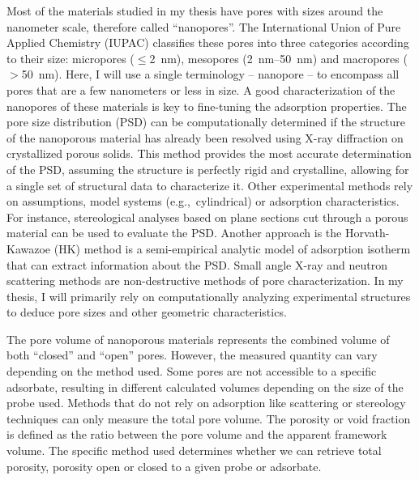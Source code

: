 \documentclass[main.tex]{subfiles}
\begin{document}

Most of the materials studied in my thesis have pores with sizes around the nanometer scale, therefore called ``nanopores''. The International Union of Pure Applied Chemistry (IUPAC) classifies these pores into three categories according to their size: micropores ($\leq$\SI{2}{\nano\meter}), mesopores (\SI{2}{\nano\meter}--\SI{50}{\nano\meter}) and macropores ($>$\SI{50}{\nano\meter}).\autocite{Sing_1985} Here, I will use a single terminology -- nanopore -- to encompass all pores that are a few nanometers or less in size. A good characterization of the nanopores of these materials is key to fine-tuning the adsorption properties.\autocite{Yan_2020} The pore size distribution (PSD) can be computationally determined if the structure of the nanoporous material has already been resolved using X-ray diffraction on crystallized porous solids. This method provides the most accurate determination of the PSD, assuming the structure is perfectly rigid and crystalline, allowing for a single set of structural data to characterize it. Other experimental methods rely on assumptions, model systems (e.g.,\ cylindrical) or adsorption characteristics. For instance, stereological analyses based on plane sections cut through a porous material can be used to evaluate the PSD.\autocite{Haynes_1973} Another
approach is the Horvath-Kawazoe (HK) method is a semi-empirical analytic model of adsorption isotherm that can extract information about the PSD. Small angle X-ray and neutron scattering methods are non-destructive methods of pore characterization.\autocite{Radlinski_2004} In my thesis, I will primarily rely on computationally analyzing experimental structures to deduce pore sizes and other geometric characteristics. 

The pore volume of nanoporous materials represents the combined volume of both ``closed''
and ``open'' pores. However, the measured quantity can vary depending on the method used.
Some pores are not accessible to a specific adsorbate, resulting in different calculated
volumes depending on the size of the probe used. Methods that do not rely on adsorption like scattering or stereology techniques can only measure the total pore volume. The porosity or void fraction is defined as the ratio between the pore volume and the apparent framework volume. The specific method used determines whether we can retrieve total
porosity, porosity open or closed to a given probe or adsorbate.
\end{document}
